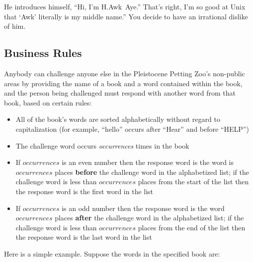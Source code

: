 \transitiontwo

He introduces himself, ``Hi, I'm H.Awk~Aye.'' That's right, I'm so good at Unix that `Awk' literally is my middle name.''
You decide to have an irrational dislike of him.

\transitionthree

\transitionfour

\subsection{Business Rules}


Anybody can challenge anyone else in the Pleistocene Petting Zoo's non-public areas by providing the name of a book and a word contained within the book, and the person being challenged must respond with another word from that book, based on certain rules:
\begin{itemize}
    \item All of the book's words are sorted alphabetically without regard to capitalization (for example, ``hello'' occurs after ``Hear'' and before ``HELP'')
    \item The challenge word occurs \textit{occurrences} times in the book
    \item If $occurrences$ is an even number then the response word is the word is $occurrences$ places \textbf{before} the challenge word in the alphabetized list;
    if the challenge word is less than $occurrences$ places from the start of the list then the response word is the first word in the list
    \item If $occurrences$ is an odd number then the response word is the word $occurrences$ places \textbf{after} the challenge word in the alphabetized list;
    if the challenge word is less than $occurrences$ places from the end of the list then the response word is the last word in the list
\end{itemize}

Here is a simple example.
Suppose the words in the specified book are:

